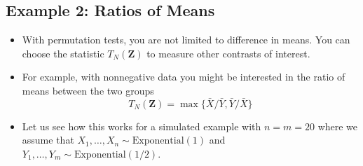 \documentclass[]{book}
\begin{document}
\hypertarget{example-2-ratios-of-means}{%
\subsection{Example 2: Ratios of Means}\label{example-2-ratios-of-means}}

\begin{itemize}
\item
  With permutation tests, you are not limited to difference in means. You can choose
  the statistic \(T_{N}(\mathbf{Z})\) to measure other contrasts of interest.
\item
  For example, with nonnegative data you might be interested in the ratio of means between the two groups
  \begin{equation}
  T_{N}( \mathbf{Z} ) = \max\Big\{ \bar{X}/\bar{Y} , \bar{Y}/\bar{X}  \Big\}
  \end{equation}
\item
  Let us see how this works for a simulated example with \(n = m = 20\) where we assume that
  \(X_{1}, \ldots, X_{n} \sim \textrm{Exponential}(1)\) and \(Y_{1}, \ldots, Y_{m} \sim \textrm{Exponential}(1/2)\).
\end{itemize}
\end{document}
